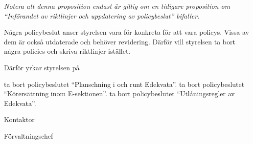\documentclass[../_main/handlingar.tex]{subfiles}
\begin{document}

\emph{Notera att denna proposition endast är giltig om en tidigare proposition om ``Införandet av riktlinjer och uppdatering av policybeslut'' bifaller.}

Några policybeslut anser styrelsen vara för konkreta för att vara policys. Vissa av dem är också utdaterade och behöver revidering. Därför vill styrelsen ta bort några policies och skriva riktlinjer istället.

Därför yrkar styrelsen på
\begin{attsatser}
    \att ta bort policybeslutet ``Planschning i och runt Edekvata''.
    \att ta bort policybeslutet ``Körersättning inom E-sektionen''.
    \att ta bort policybeslutet ``Utlåningsregler av Edekvata''.
\end{attsatser}

\begin{signatures}{2}
    \ist
    \signature{Erik Månsson}{Kontaktor}
    \signature{Anders Nilsson}{Förvaltningschef}
\end{signatures}
\end{document}
